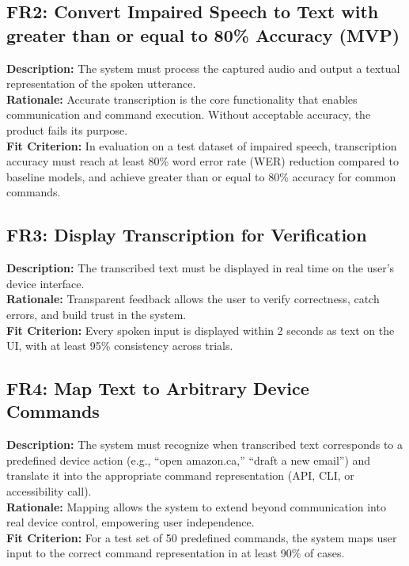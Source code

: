\documentclass[11pt]{article}
\begin{document}
\subsection{FR2: Convert Impaired Speech to Text with greater than or equal to 80\% Accuracy (MVP)}
\textbf{Description:} The system must process the captured audio and output a textual representation of the spoken utterance.\\
\textbf{Rationale:} Accurate transcription is the core functionality that enables communication and command execution. Without acceptable accuracy, the product fails its purpose.\\
\textbf{Fit Criterion:} In evaluation on a test dataset of impaired speech, transcription accuracy must reach at least 80\% word error rate (WER) reduction compared to baseline models, and achieve greater than or equal to 80\% accuracy for common commands.

\bigskip
\subsection{FR3: Display Transcription for Verification}
\textbf{Description:} The transcribed text must be displayed in real time on the user’s device interface.\\
\textbf{Rationale:} Transparent feedback allows the user to verify correctness, catch errors, and build trust in the system.\\
\textbf{Fit Criterion:} Every spoken input is displayed within 2 seconds as text on the UI, with at least 95\% consistency across trials.

\bigskip
\subsection{FR4: Map Text to Arbitrary Device Commands}
\textbf{Description:} The system must recognize when transcribed text corresponds to a predefined device action (e.g., “open amazon.ca,” “draft a new email”) and translate it into the appropriate command representation (API, CLI, or accessibility call).\\
\textbf{Rationale:} Mapping allows the system to extend beyond communication into real device control, empowering user independence.\\
\textbf{Fit Criterion:} For a test set of 50 predefined commands, the system maps user input to the correct command representation in at least 90\% of cases.

\bigskip
\end{document}
